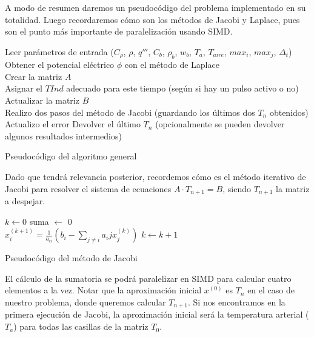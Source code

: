 \documentclass[a4paper]{article}
\begin{document}
A modo de resumen daremos un pseudocódigo del problema implementado en 
su totalidad. Luego recordaremos cómo son los métodos de Jacobi y 
Laplace, pues son el punto más importante de paralelización usando SIMD.\\

\begin{algorithm}[H]
\SetAlgoLined
Leer par\'ametros de entrada ($C_{\rho}$, $\rho$, $q'''$, $C_b$, $\rho_b$, $w_b$, $T_a$, $T_{aire}$, $max_i$, $max_j$, $\Delta_t$) \\
Obtener el potencial el\'ectrico $\phi$ con el método de Laplace \\
Crear la matriz $A$ \\

 {
	Asignar el $TInd$ adecuado para este tiempo (según si hay un pulso activo o no)\\
	Actualizar la matriz $B$ \\
	 {
		Realizo dos pasos del método de Jacobi (guardando los últimos dos $T_n$ obtenidos)
		Actualizo el error
	}
}
Devolver el último $T_n$ (opcionalmente se pueden devolver algunos resultados intermedios)
\caption{Pseudocódigo del algoritmo general}
\end{algorithm}

\bigskip

Dado que tendrá relevancia posterior, recordemos cómo es el método 
iterativo de Jacobi para resolver el sistema de ecuaciones 
$A \cdot T_{n+1} = B$, siendo $T_{n+1}$ la matriz a despejar.\\

\begin{algorithm}[H]

$k \leftarrow 0$
 {
	suma $\leftarrow$ 0 \\
	 {
		$x_i^{(k+1)} = \frac{1}{a_{ii}}(b_i - \sum_{j \neq i} {a_ij x_j^{(k)}})$
	}
	$k \leftarrow k + 1$
}
\caption{Pseudocódigo del método de Jacobi}
\end{algorithm}

\bigskip

El cálculo de la sumatoria se podrá paralelizar en SIMD para calcular 
cuatro elementos a la vez. Notar que la aproximación inicial $x^{(0)}$ 
es $T_n$ en el caso de nuestro problema, donde queremos calcular $T_{n+1}$. 
Si nos encontramos en la primera ejecución de Jacobi, la aproximación 
inicial será la temperatura arterial ($T_a$) para todas las casillas 
de la matriz $T_0$. \\
\end{document}
